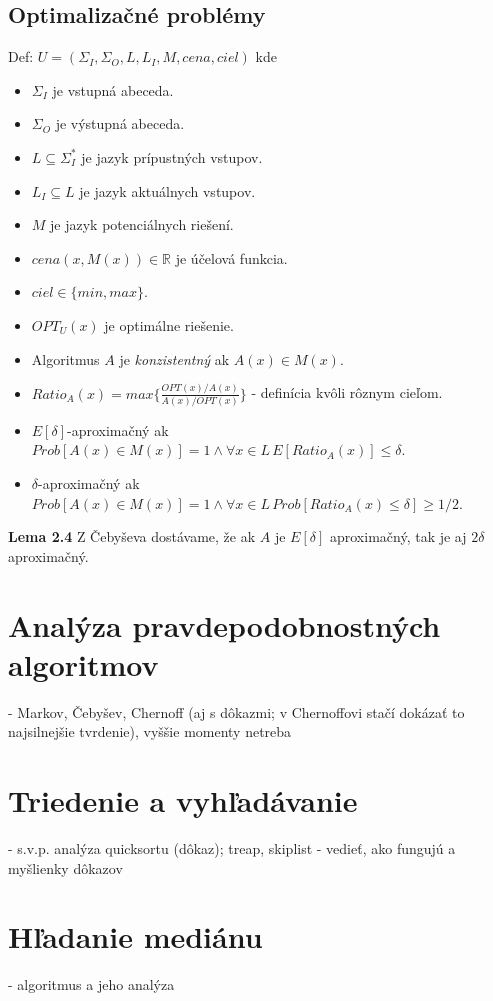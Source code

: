 \documentclass[12pt,a4paper]{article}
\begin{document}
  \subsection{Optimalizačné problémy} 
  Def: $U = (\Sigma_I, \Sigma_O, L, L_I, M, cena, ciel)$ kde 
  \begin{itemize}
    \item $\Sigma_I$ je vstupná abeceda.
    \item $\Sigma_O$ je výstupná abeceda.
    \item $L \subseteq \Sigma_I^{*}$ je jazyk prípustných vstupov.
    \item $L_I \subseteq L$ je jazyk aktuálnych vstupov.
    \item $M$ je jazyk potenciálnych riešení.
    \item $cena(x,M(x)) \in \mathbb{R}$ je účelová funkcia.
    \item $ciel \in \{min, max\}$.
    \item $OPT_U(x)$ je optimálne riešenie.
    \item Algoritmus $A$ je \emph{konzistentný} ak $A(x) \in M(x)$. 
    \item $Ratio_A(x) = max\{\frac{OPT(x)/A(x)}{A(x)/OPT(x)}\}$ - definícia kvôli rôznym cieľom. 
    \item $E[\delta]$-aproximačný ak $Prob[A(x) \in M(x)] = 1 \wedge \forall x \in L \, E[Ratio_A(x)] \leq \delta$. 
    \item $\delta$-aproximačný ak $Prob[A(x) \in M(x)] = 1 \wedge \forall x \in L \, Prob[Ratio_A(x) \leq \delta] \geq 1/2$. 
  \end{itemize} 
  
  {\bf Lema 2.4} Z Čebyševa dostávame, že ak $A$ je $E[\delta]$ aproximačný, tak je aj $2 \delta$ aproximačný. 

\section{Analýza pravdepodobnostných algoritmov}
 - Markov, Čebyšev, Chernoff (aj s dôkazmi; v Chernoffovi stačí dokázať to najsilnejšie tvrdenie), vyššie momenty netreba
 

\section{Triedenie a vyhľadávanie}
 - s.v.p. analýza quicksortu (dôkaz); treap, skiplist - vedieť, ako fungujú a myšlienky dôkazov
 

\section{Hľadanie mediánu}
 - algoritmus a jeho analýza
 
\end{document}
